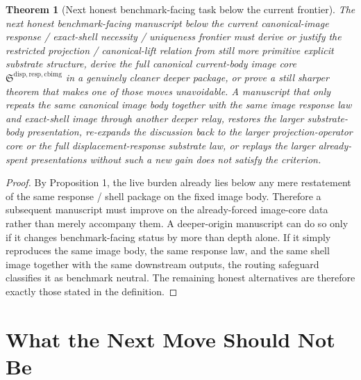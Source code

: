 \documentclass[11pt]{article}
\newcommand{\CurrentBodyImageCore}{\mathfrak S^{\mathrm{disp,resp,cbimg}}}
\newtheorem{theorem}{Theorem}
\begin{document}
\begin{theorem}[Next honest benchmark-facing task below the current frontier]
The next honest benchmark-facing manuscript below the current canonical-image response / exact-shell necessity / uniqueness frontier must derive or justify the restricted projection / canonical-lift relation from still more primitive explicit substrate structure, derive the full canonical current-body image core \(\CurrentBodyImageCore\) in a genuinely cleaner deeper package, or prove a still sharper theorem that makes one of those moves unavoidable. A manuscript that only repeats the same canonical image body together with the same image response law and exact-shell image through another deeper relay, restores the larger substrate-body presentation, re-expands the discussion back to the larger projection-operator core or the full displacement-response substrate law, or replays the larger already-spent presentations without such a new gain does not satisfy the criterion.
\end{theorem}

\begin{proof}
By Proposition 1, the live burden already lies below any mere restatement of the same response / shell package on the fixed image body. Therefore a subsequent manuscript must improve on the already-forced image-core data rather than merely accompany them. A deeper-origin manuscript can do so only if it changes benchmark-facing status by more than depth alone. If it simply reproduces the same image body, the same response law, and the same shell image together with the same downstream outputs, the routing safeguard classifies it as benchmark neutral. The remaining honest alternatives are therefore exactly those stated in the definition.
\end{proof}

\section{What the Next Move Should Not Be}
\end{document}
